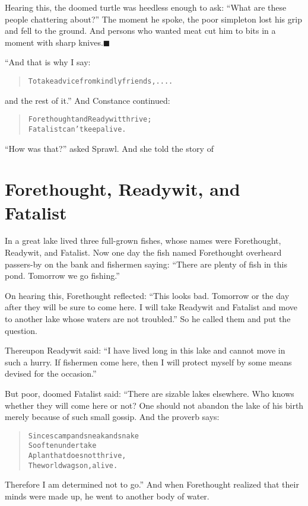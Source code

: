 \documentclass[article, twoside, 14pt]{memoir}
\newcommand{\qed}{\hfill \ensuremath{\blacksquare}}
\renewenvironment{verbatim}{%
\begin{quote}%
\vskip -10pt%
\begin{alltt}\normalfont\large}{\end{alltt}%
\end{quote}%
\vskip -10pt
} %
\begin{document}
Hearing this, the doomed turtle was heedless enough to ask:
``What are these people chattering about?'' The moment he spoke,
the poor simpleton lost his grip and fell to the ground. And
persons who wanted meat cut him to bits in a moment with sharp
knives.\hyperref[s19]{\qed}

“And that is why I say:

\begin{verbatim}
To take advice from kindly friends, ....
\end{verbatim}
and the rest of it.” And Constance continued:

\begin{verbatim}
Forethought and Ready wit thrive;
Fatalist can't keep alive.
\end{verbatim}
``How was that?'' asked Sprawl. And she told the story of

\chapter{Forethought, Readywit, and Fatalist}

\label{s20}

In a great lake lived three full-grown fishes, whose names were
Forethought, Readywit, and Fatalist. Now one day the fish named
Forethought overheard passers-by on the bank and fishermen saying:
``There are plenty of fish in this pond. Tomorrow we go fishing.''

On hearing this, Forethought reflected:
``This looks bad. Tomorrow or the day after they will be sure to come here. I will take Readywit and Fatalist and move to another lake whose waters are not troubled.''
So he called them and put the question.

Thereupon Readywit said:
``I have lived long in this lake and cannot move in such a hurry. If fishermen come here, then I will protect myself by some means devised for the occasion.''

But poor, doomed Fatalist said: “There are sizable lakes elsewhere.
Who knows whether they will come here or not? One should not
abandon the lake of his birth merely because of such small gossip.
And the proverb says:

\begin{verbatim}
Since scamp and sneak and snake
So often undertake
A plan that does not thrive,
The world wags on, alive.
\end{verbatim}
Therefore I am determined not to go.” And when Forethought realized
that their minds were made up, he went to another body of water.
\end{document}

